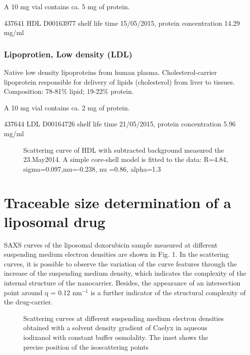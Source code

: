 A 10 mg vial contains ca. 5 mg of protein. 


437641 HDL D00163977 shelf life time 15/05/2015, protein concentration 14.29 mg/ml

\subsubsection{Lipoprotien, Low density (LDL)}

Native low density lipoproteins from human plasma. Cholesterol-carrier lipoprotein responsible for delivery of lipids (cholesterol) from liver to tissues. Composition: 78-81$\%$ lipid; 19-22$\%$ protein.

A 10 mg vial contains ca. 2 mg of protein.

437644 LDL D00164726 shelf life time 21/05/2015,
protein concentration 5.96 mg/ml

\begin{figure}
	\centering
		
		\caption{Scattering curve of HDL with subtracted background measured the 23.May2014. A simple core-shell model is fitted to the data: R=4.84, sigma=0.097,mu=-0.238, nu	=0.86, alpha=1.3}
		\label{fig:HDLCoreShellFit}
\end{figure}

\section{Traceable size determination of a liposomal drug}
SAXS curves of the liposomal doxorubicin sample measured at different suspending medium electron densities are shown in Fig. 1. In the scattering curves, it is possible to observe the variation of the curve features through the increase of the suspending medium density, which indicates the complexity of the internal structure of the nanocarrier. Besides, the appearance of an intersection point around q = 0.12 nm$^{-1}$ is a further indicator of the structural complexity of the drug-carrier.

\begin{figure}
	\centering
		\caption{Scattering curves at different suspending medium electron densities obtained with a solvent density gradient of Caelyx in aqueous iodixanol with constant buffer osmolality. The inset shows the precise position of the isoscattering points}
\end{figure}

